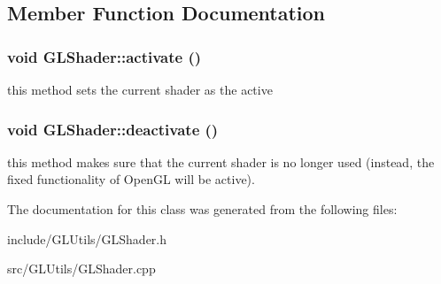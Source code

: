 \subsection{Member Function Documentation}
\hypertarget{classCartWheel_1_1GL_1_1GLShader_a1e1f376f1406f483fbd24dfc47e26e00}{
\subsubsection[{activate}]{\setlength{\rightskip}{0pt plus 5cm}void GLShader::activate ()}}
\label{classCartWheel_1_1GL_1_1GLShader_a1e1f376f1406f483fbd24dfc47e26e00}
this method sets the current shader as the active \hypertarget{classCartWheel_1_1GL_1_1GLShader_a1cd3547b8b8eeba8645cee7f4f585a3a}{
\subsubsection[{deactivate}]{\setlength{\rightskip}{0pt plus 5cm}void GLShader::deactivate ()}}
\label{classCartWheel_1_1GL_1_1GLShader_a1cd3547b8b8eeba8645cee7f4f585a3a}
this method makes sure that the current shader is no longer used (instead, the fixed functionality of OpenGL will be active). 

The documentation for this class was generated from the following files:\begin{DoxyCompactItemize}
\item 
include/GLUtils/GLShader.h\item 
src/GLUtils/GLShader.cpp\end{DoxyCompactItemize}
